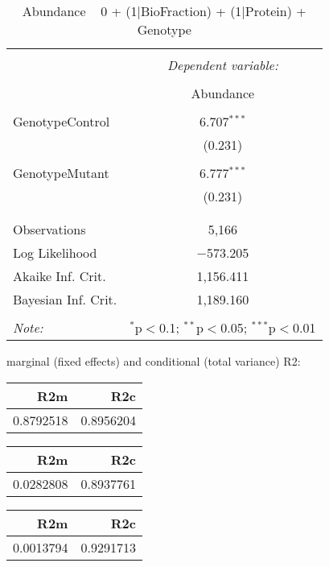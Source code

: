 \documentclass[11pt]{report}
\begin{document}
\begin{table}[!htbp] \centering 
  \caption{Abundance ~ 0 + (1|BioFraction) + (1|Protein) + Genotype} 
  \label{} 
\begin{tabular}{@{\extracolsep{5pt}}lc} 
\\[-1.8ex]\hline 
\hline \\[-1.8ex] 
 & \multicolumn{1}{c}{\textit{Dependent variable:}} \\ 
\cline{2-2} 
\\[-1.8ex] & Abundance \\ 
\hline \\[-1.8ex] 
 GenotypeControl & 6.707$^{***}$ \\ 
  & (0.231) \\ 
  & \\ 
 GenotypeMutant & 6.777$^{***}$ \\ 
  & (0.231) \\ 
  & \\ 
\hline \\[-1.8ex] 
Observations & 5,166 \\ 
Log Likelihood & $-$573.205 \\ 
Akaike Inf. Crit. & 1,156.411 \\ 
Bayesian Inf. Crit. & 1,189.160 \\ 
\hline 
\hline \\[-1.8ex] 
\textit{Note:}  & \multicolumn{1}{r}{$^{*}$p$<$0.1; $^{**}$p$<$0.05; $^{***}$p$<$0.01} \\ 
\end{tabular} 
\end{table} 
marginal (fixed effects) and conditional (total variance) R2:

\begin{tabular}{r|r}
\hline
R2m & R2c\\
\hline
0.8792518 & 0.8956204\\
\hline
\end{tabular}

\begin{tabular}{r|r}
\hline
R2m & R2c\\
\hline
0.0282808 & 0.8937761\\
\hline
\end{tabular}

\begin{tabular}{r|r}
\hline
R2m & R2c\\
\hline
0.0013794 & 0.9291713\\
\hline
\end{tabular}
\end{document}
